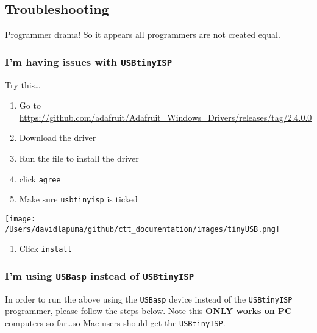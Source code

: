 \documentclass[
]{article}
\providecommand{\tightlist}{%
  \setlength{\itemsep}{0pt}\setlength{\parskip}{0pt}}
\begin{document}
\hypertarget{troubleshooting}{%
\subsection{Troubleshooting}\label{troubleshooting}}

Programmer drama! So it appears all programmers are not created equal.

\hypertarget{im-having-issues-with-usbtinyisp}{%
\subsubsection{\texorpdfstring{I'm having issues with
\texttt{USBtinyISP}}{I'm having issues with USBtinyISP}}\label{im-having-issues-with-usbtinyisp}}

Try this\ldots{}

\begin{enumerate}
\def\labelenumi{\arabic{enumi}.}
\tightlist
\item
  Go to
  \url{https://github.com/adafruit/Adafruit_Windows_Drivers/releases/tag/2.4.0.0}
\item
  Download the driver
\item
  Run the file to install the driver
\item
  click \texttt{agree}
\item
  Make sure \texttt{usbtinyisp} is ticked
\end{enumerate}

\texttt{[image: /Users/davidlapuma/github/ctt\_documentation/images/tinyUSB.png]}

\begin{enumerate}
\def\labelenumi{\arabic{enumi}.}
\setcounter{enumi}{5}
\tightlist
\item
  Click \texttt{install}
\end{enumerate}

\hypertarget{im-using-usbasp-instead-of-usbtinyisp}{%
\subsubsection{\texorpdfstring{I'm using \texttt{USBasp} instead of
\texttt{USBtinyISP}}{I'm using USBasp instead of USBtinyISP}}\label{im-using-usbasp-instead-of-usbtinyisp}}

In order to run the above using the \texttt{USBasp} device instead of
the \texttt{USBtinyISP} programmer, please follow the steps below. Note
this \textbf{ONLY works on PC} computers so far\ldots so Mac users
should get the \texttt{USBtinyISP}.
\end{document}
